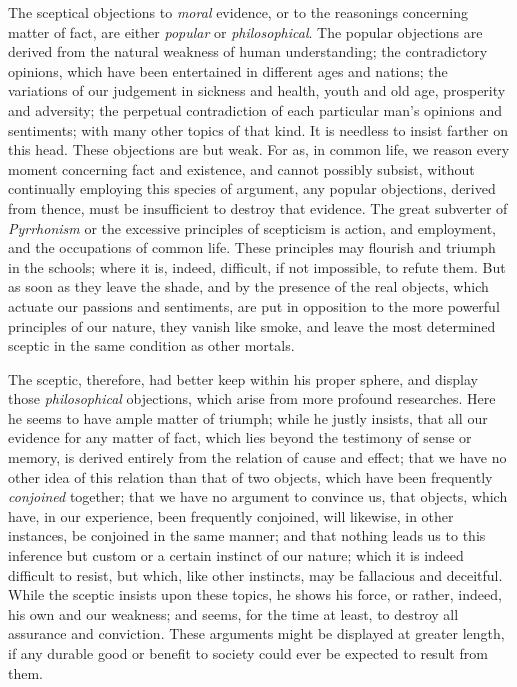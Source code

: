\documentclass[]{article}
\begin{document}
\begin{sectionbody}
\humeparagraph  The sceptical objections to \emph{moral} evidence, or to the reasonings concerning matter of fact, are either \emph{popular}  or \emph{philosophical}. The popular objections are derived from the natural weakness of human understanding; the contradictory opinions, which have been entertained in different ages and nations; the variations of our judgement in sickness and health, youth and old age, prosperity and adversity; the perpetual contradiction of each particular man's opinions and sentiments; with many other topics of that kind. It is needless to insist farther on this head. These objections are but weak. For as, in common life, we reason every moment concerning fact and existence, and cannot possibly subsist, without continually employing this species of argument, any popular objections, derived from thence, must be insufficient to destroy that evidence. The great subverter of \emph{Pyrrhonism} or the excessive principles of scepticism is action, and employment, and the occupations of common life. These principles may flourish and triumph in the schools; where it is, indeed, difficult, if not impossible, to refute them. But as soon as they leave the shade, and by the presence of the real objects, which actuate our passions and sentiments, are put in opposition to the more powerful principles of our nature, they vanish like smoke, and leave the most determined sceptic in the same condition as other mortals.

\humeparagraph  The sceptic, therefore, had better keep within his proper sphere, and display those \emph{philosophical} objections, which arise from more profound researches. Here he seems to have ample matter of triumph; while he justly insists, that all our evidence for any matter of fact, which lies beyond the testimony of sense or memory, is derived entirely from the relation of cause and effect; that we have no other idea of this relation than that of two objects, which have been frequently \emph{conjoined} together; that we have no argument to convince us, that objects, which have, in our experience, been frequently conjoined, will likewise, in other instances, be conjoined in the same manner; and that nothing leads us to this inference but custom or a certain instinct of our nature; which it is indeed difficult to resist, but which, like other instincts, may be fallacious and deceitful. While the sceptic insists upon these topics, he shows his force, or rather, indeed, his own and our weakness; and seems, for the time at least, to destroy all assurance and conviction. These arguments might be displayed at greater length, if any durable good or benefit to society could ever be expected to result from them.


\end{sectionbody}
\end{document}
